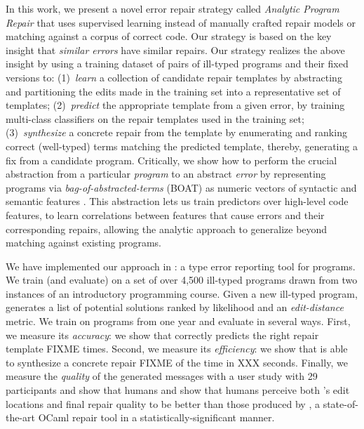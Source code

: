 %
In this work, we present a novel error repair
strategy called \emph{Analytic Program Repair}
that uses supervised learning instead of manually
crafted repair models or matching against a corpus
of correct code.
%
Our strategy is based on the key insight that
\emph{similar errors} have similar repairs.
%
Our strategy realizes the above insight by using
a training dataset of pairs of ill-typed programs
and their fixed versions to:
%
(1)~\emph{learn} a collection of candidate repair templates
    by abstracting and partitioning the edits made in the
    training set into a representative set of templates;
%
(2)~\emph{predict} the appropriate template from a given error,
    by training multi-class classifiers on the repair templates
    used in the training set;
%
(3)~\emph{synthesize} a concrete repair from the template
   by enumerating and ranking correct (\eg well-typed)
   terms matching the predicted template,
%
thereby, generating a fix from a candidate program.
%
Critically, we show how to perform the crucial abstraction
from a particular \emph{program} to an abstract \emph{error}
by representing programs via \emph{bag-of-abstracted-terms} (BOAT)
\ie as numeric vectors of syntactic and semantic features \cite{Seidel2017-ko}.
%
This abstraction lets us train predictors over high-level
code features, \ie to learn correlations between features
that cause errors and their corresponding repairs, allowing
the analytic approach to generalize beyond matching against
existing programs.

\mypara{\toolname}
%
We have implemented our approach in \toolname: a type error reporting
tool for \ocaml programs. We train (and evaluate) \toolname on a set of
over 4,500 ill-typed \ocaml programs drawn from two instances of an
introductory programming course.
%
Given a new ill-typed program, \toolname generates a list of potential
solutions ranked by likelihood and an \emph{edit-distance} metric.
We train \toolname on programs from one year and evaluate in several
ways.
%
First, we measure its \emph{accuracy}: we show that \toolname correctly
predicts the right repair template {FIXME} times.
%
Second, we measure its \emph{efficiency}: we show that \toolname is able
to synthesize a concrete repair {FIXME} of the time in XXX seconds.
%
Finally, we measure the \emph{quality} of the generated messages with
a user study with 29 participants and show that humans and show that
humans perceive both \toolname's edit locations and final repair quality
to be better than those produced by \seminal, a state-of-the-art OCaml
repair tool \cite{Lerner2007} in a statistically-significant manner.

